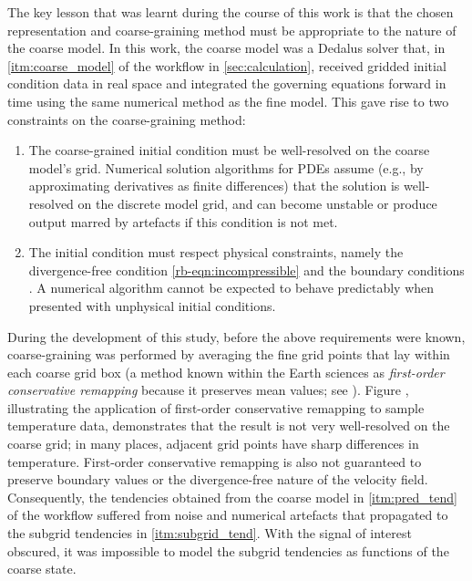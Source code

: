 \documentclass[../main.tex]{subfiles}
\begin{document}
The key lesson that was learnt during the course of this work is that the
chosen representation and coarse-graining method must be appropriate to the
nature of the coarse model. In this work, the coarse model was a Dedalus solver
that, in \cref{itm:coarse_model} of the workflow in \cref{sec:calculation},
received gridded initial condition data in real space and integrated the
governing equations forward in time using the same numerical method as the
fine model. This gave rise to two constraints on the coarse-graining method:
\begin{enumerate}
    \item The coarse-grained initial condition must be well-resolved on the
        coarse model's grid. Numerical solution algorithms for PDEs assume
        (e.g., by approximating derivatives as finite differences) that the
        solution is well-resolved on the discrete model grid, and can become
        unstable or produce output marred by artefacts if this condition is not
        met.
    \item The initial condition must respect physical constraints, namely the
        divergence-free condition \cref{rb-eqn:incompressible} and the boundary
        conditions . A numerical
        algorithm cannot be expected to behave predictably when presented with
        unphysical initial conditions.
\end{enumerate}

During the development of this study, before the above requirements were known,
coarse-graining was performed by averaging the fine grid points that lay within
each coarse grid box (a method known within the Earth sciences as
\emph{first-order conservative remapping} because it preserves mean values;
see \cite{jones1999}). Figure , illustrating the application of first-order conservative remapping
to sample temperature data, demonstrates that the result is not very
well-resolved on the coarse grid; in many places, adjacent grid points have
sharp differences in temperature. First-order conservative remapping is also
not guaranteed to preserve boundary values or the divergence-free nature of the
velocity field. Consequently, the tendencies obtained from the coarse model in
\cref{itm:pred_tend} of the workflow suffered from noise and numerical
artefacts that propagated to the subgrid tendencies in \cref{itm:subgrid_tend}.
With the signal of interest obscured, it was impossible to model the subgrid
tendencies as functions of the coarse state.
\end{document}

